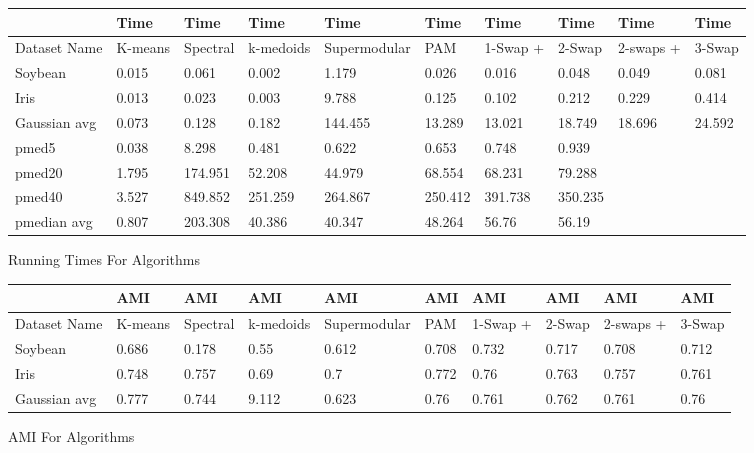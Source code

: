 \documentclass{article}
\begin{document}
\begin{figure*}[h]
\small
\begin{tabular}{ | l | l | l | l | l | l | l | l | l | l | }
\hline
	  & Time & Time & Time & Time & Time & Time & Time & Time & Time \\ \hline
	Dataset Name & K-means & Spectral & k-medoids & Supermodular & PAM & 1-Swap + & 2-Swap & 2-swaps + & 3-Swap \\ \hline
	Soybean & 0.015 & 0.061 & 0.002 & 1.179 & 0.026 & 0.016 & 0.048 & 0.049 & 0.081 \\ 
	Iris & 0.013 & 0.023 & 0.003 & 9.788 & 0.125 & 0.102 & 0.212 & 0.229 & 0.414 \\ 
	Gaussian avg & 0.073 & 0.128 & 0.182 & 144.455 & 13.289 & 13.021 & 18.749 & 18.696 & 24.592 \\ 
	pmed5 & 0.038 & 8.298 & 0.481 & 0.622 & 0.653 & 0.748 & 0.939 & \  & \  \\ 
	pmed20 & 1.795 & 174.951 & 52.208 & 44.979 & 68.554 & 68.231 & 79.288 & \  & \  \\ 
	pmed40 & 3.527 & 849.852 & 251.259 & 264.867 & 250.412 & 391.738 & 350.235 & \  & \  \\ 
	pmedian avg & 0.807 & 203.308 & 40.386 & 40.347 & 48.264 & 56.76 & 56.19 & \  & \  \\ \hline
\end{tabular}


\caption{Running Times For Algorithms}
\end{figure*}

\begin{figure*}[h]
\small
\begin{tabular}{ | l | l | l | l | l | l | l | l | l | l | }
\hline
	  & AMI & AMI & AMI & AMI & AMI & AMI & AMI & AMI & AMI \\ \hline
	Dataset Name & K-means & Spectral & k-medoids & Supermodular & PAM & 1-Swap + & 2-Swap & 2-swaps + & 3-Swap \\ \hline
	Soybean & 0.686 & 0.178 & 0.55 & 0.612 & 0.708 & 0.732 & 0.717 & 0.708 & 0.712 \\ 
	Iris & 0.748 & 0.757 & 0.69 & 0.7 & 0.772 & 0.76 & 0.763 & 0.757 & 0.761 \\ 
	Gaussian avg & 0.777 & 0.744 & 9.112 & 0.623 & 0.76 & 0.761 & 0.762 & 0.761 & 0.76 \\ \hline
\end{tabular}



\caption{AMI For Algorithms}
\end{figure*}
\end{document}
